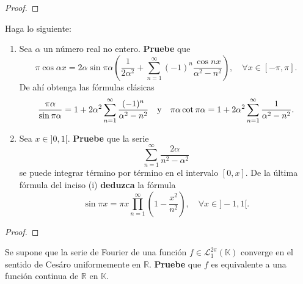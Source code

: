\documentclass[12pt]{report}
\theoremstyle{largebreak}
\begin{document}
    \begin{proof}
        
    \end{proof}

    \begin{excer}
        Haga lo siguiente:
        \begin{enumerate}
            \item Sea $\alpha$ un número real no entero. \textbf{Pruebe} que
            \begin{equation*}
                \pi\cos\alpha x=2\alpha\sin\pi\alpha\left(\frac{1}{2\alpha^2}+\sum_{ n=1}^\infty(-1)^n\frac{\cos nx}{\alpha^2-n^2} \right),\quad\forall x\in[-\pi,\pi].
            \end{equation*}
            De ahí obtenga las fórmulas clásicas
            \begin{equation*}
                \frac{\pi\alpha}{\sin\pi\alpha}=1+2\alpha^2\sum_{ n=1}^\infty\frac{(-1)^n}{\alpha^2-n^2}\quad\textup{y}\quad\pi\alpha\cot\pi\alpha=1+2\alpha^2\sum_{ n=1}^\infty\frac{1}{\alpha^2-n^2}.
            \end{equation*}
            \item Sea $x\in]0,1[$. \textbf{Pruebe} que la serie
            \begin{equation*}
                \sum_{ n=1}^\infty\frac{2\alpha}{n^2-\alpha^2}
            \end{equation*}
            se puede integrar término por término en el intervalo $[0,x]$. De la última fórmula del inciso (i) \textbf{deduzca} la fórmula
            \begin{equation*}
                \sin\pi x=\pi x\prod_{ n=1}^\infty\left(1-\frac{x^2}{n^2} \right),\quad\forall x\in]-1,1[.
            \end{equation*}
        \end{enumerate}
    \end{excer}

    \begin{proof}
        
    \end{proof}

    \begin{excer}
        Se supone que la serie de Fourier de una función $f\in\mathcal{L}_1^{2\pi}(\mathbb{K})$ converge en el sentido de Cesáro uniformemente en $\mathbb{R}$. \textbf{Pruebe} que $f$ es equivalente a una función continua de $\mathbb{R}$ en $\mathbb{K}$.
    \end{excer}
\end{document}
